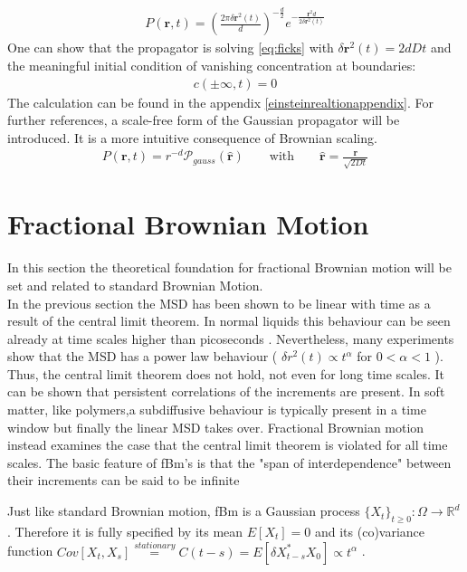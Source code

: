 \documentclass[
  a4paper,BCOR10mm,oneside,
  bibtotoc,idxtotoc,
  headsepline,footsepline,%
  fleqn,openbib
]{scrbook}
\begin{document}
\begin{align}
 P(\bm{r},t)=  \left(\frac{2 \pi \delta \bm{r}^2(t)}{d}\right)^{- \frac{d}{2}} e^{- \frac{\bm{r}^2 d}{2 \delta \bm{r}^2(t)}} \label{propagator}
\end{align}
One can show that the propagator is solving \cref{eq:ficks} with $\delta \bm{r}^2(t)=2dDt$ and the meaningful initial condition of vanishing concentration at boundaries: 
\begin{align}
c(\pm \infty,t)=0
\end{align}
The calculation can be found in the appendix \ref{einsteinrealtionappendix}.
For further references, a scale-free form of the Gaussian propagator will be introduced. It is a more intuitive consequence of Brownian scaling.
\begin{align}
P(\bm{r},t)= r^{-d} \mathcal{P}_{gauss}(\hat{\bm{r}})  \qquad \text{with} \qquad \hat{\bm{r}} = \frac{\bm{r}}{\sqrt{2Dt}} \label{scalefreeform}
\end{align}



\section{Fractional Brownian Motion}\label{sectionfrac}
In this section the theoretical foundation for fractional Brownian motion will be set and related to standard Brownian Motion. \\
In the previous section the MSD has been shown to be linear with time as a result of the central limit theorem. In normal liquids this behaviour can be seen already at time scales higher than picoseconds \cite{Hofling2013}. Nevertheless, many experiments show that the MSD has a power law behaviour ( $\delta r ^2 (t) \propto t^{\alpha}$ for  $0 < \alpha < 1$ ). Thus, the central limit theorem does not hold, not even for long time scales. It can be shown that persistent correlations of the increments are present. In soft matter, like polymers,a subdiffusive behaviour is typically present in a time window but finally the linear MSD takes over. Fractional Brownian motion instead examines the case that the central limit theorem is violated for all time scales. The basic feature of fBm's is that the "span of interdependence" between their increments can be said to be infinite\cite{Mandelbrot1968}\\
\begin{mydef}
Just like standard Brownian motion, fBm is a Gaussian process $\{X_t\}_{t\geq0}: \Omega \rightarrow \mathbb{R}^d$. Therefore it is fully specified by its mean $E[X_t]=0$ and its (co)variance function $Cov[X_t,X_s]\stackrel{stationary} {=}C(t-s)=E[\delta X_{t-s}^* X_{0}]\propto t^\alpha$ . 
\end{mydef}
\end{document}
